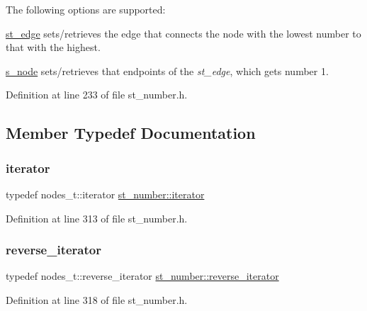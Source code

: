 The following options are supported\+:
\begin{DoxyItemize}
\item \mbox{\hyperlink{classst__number_a1564af6f603160105643f22bf2f6955b}{st\+\_\+edge}} sets/retrieves the edge that connects the node with the lowest number to that with the highest.
\item \mbox{\hyperlink{classst__number_aa607c9aaa5a4d9c45e5854ce672f0fda}{s\+\_\+node}} sets/retrieves that endpoints of the {\itshape st\+\_\+edge}, which gets number 1. 
\end{DoxyItemize}

Definition at line 233 of file st\+\_\+number.\+h.



\subsection{Member Typedef Documentation}
\mbox{\label{classst__number_a3aa3701636f69a567c5f6a676afafd39}} 
\subsubsection{\texorpdfstring{iterator}{iterator}}
{\footnotesize\ttfamily typedef nodes\+\_\+t\+::iterator \mbox{\hyperlink{classst__number_a3aa3701636f69a567c5f6a676afafd39}{st\+\_\+number\+::iterator}}}



Definition at line 313 of file st\+\_\+number.\+h.

\mbox{\label{classst__number_a7db0e7ac82d781b75e1712c1fe5c055e}} 
\subsubsection{\texorpdfstring{reverse\+\_\+iterator}{reverse\_iterator}}
{\footnotesize\ttfamily typedef nodes\+\_\+t\+::reverse\+\_\+iterator \mbox{\hyperlink{classst__number_a7db0e7ac82d781b75e1712c1fe5c055e}{st\+\_\+number\+::reverse\+\_\+iterator}}}



Definition at line 318 of file st\+\_\+number.\+h.



